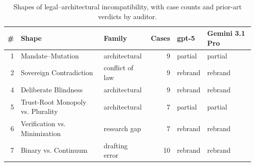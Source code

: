 \begin{table}[t]
\centering
\caption{Shapes of legal--architectural incompatibility, with case counts and prior-art verdicts by auditor.}
\label{tab:shapes}
\begin{tabular}{rllrll}
\toprule
\# & Shape & Family & Cases & gpt-5 & Gemini 3.1 Pro \\
\midrule
  1 & Mandate--Mutation & architectural & 9 & partial & partial \\
  2 & Sovereign Contradiction & conflict of law & 9 & rebrand & rebrand \\
  4 & Deliberate Blindness & architectural & 9 & rebrand & rebrand \\
  5 & Trust-Root Monopoly vs. Plurality & architectural & 7 & partial & partial \\
  6 & Verification vs. Minimization & research gap & 7 & rebrand & rebrand \\
  7 & Binary vs. Continuum & drafting error & 10 & rebrand & rebrand \\
\bottomrule
\end{tabular}
\end{table}